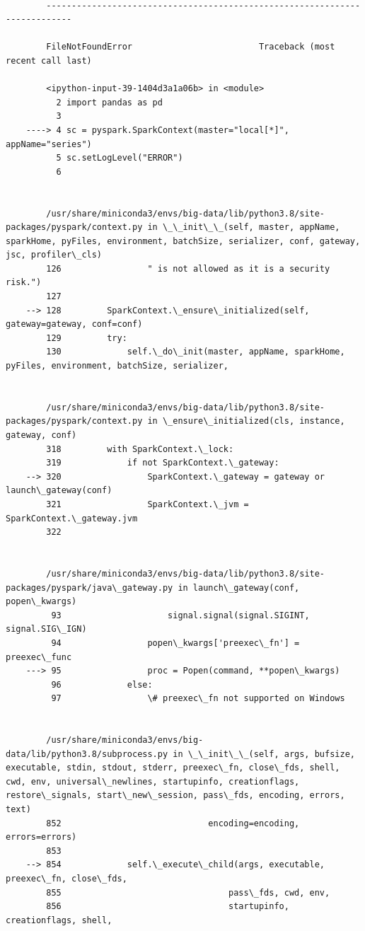 \documentclass[11pt]{article}
\begin{document}
    \begin{Verbatim}[commandchars=\\\{\}]

        ---------------------------------------------------------------------------

        FileNotFoundError                         Traceback (most recent call last)

        <ipython-input-39-1404d3a1a06b> in <module>
          2 import pandas as pd
          3 
    ----> 4 sc = pyspark.SparkContext(master="local[*]", appName="series")
          5 sc.setLogLevel("ERROR")
          6 


        /usr/share/miniconda3/envs/big-data/lib/python3.8/site-packages/pyspark/context.py in \_\_init\_\_(self, master, appName, sparkHome, pyFiles, environment, batchSize, serializer, conf, gateway, jsc, profiler\_cls)
        126                 " is not allowed as it is a security risk.")
        127 
    --> 128         SparkContext.\_ensure\_initialized(self, gateway=gateway, conf=conf)
        129         try:
        130             self.\_do\_init(master, appName, sparkHome, pyFiles, environment, batchSize, serializer,


        /usr/share/miniconda3/envs/big-data/lib/python3.8/site-packages/pyspark/context.py in \_ensure\_initialized(cls, instance, gateway, conf)
        318         with SparkContext.\_lock:
        319             if not SparkContext.\_gateway:
    --> 320                 SparkContext.\_gateway = gateway or launch\_gateway(conf)
        321                 SparkContext.\_jvm = SparkContext.\_gateway.jvm
        322 


        /usr/share/miniconda3/envs/big-data/lib/python3.8/site-packages/pyspark/java\_gateway.py in launch\_gateway(conf, popen\_kwargs)
         93                     signal.signal(signal.SIGINT, signal.SIG\_IGN)
         94                 popen\_kwargs['preexec\_fn'] = preexec\_func
    ---> 95                 proc = Popen(command, **popen\_kwargs)
         96             else:
         97                 \# preexec\_fn not supported on Windows


        /usr/share/miniconda3/envs/big-data/lib/python3.8/subprocess.py in \_\_init\_\_(self, args, bufsize, executable, stdin, stdout, stderr, preexec\_fn, close\_fds, shell, cwd, env, universal\_newlines, startupinfo, creationflags, restore\_signals, start\_new\_session, pass\_fds, encoding, errors, text)
        852                             encoding=encoding, errors=errors)
        853 
    --> 854             self.\_execute\_child(args, executable, preexec\_fn, close\_fds,
        855                                 pass\_fds, cwd, env,
        856                                 startupinfo, creationflags, shell,



\end{Verbatim}
\end{document}
